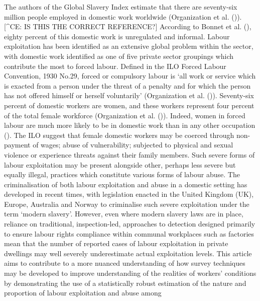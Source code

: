 \documentclass[
  12pt,
]{article}
\theoremstyle{plain}
\theoremstyle{definition}
\begin{document}
The authors of the Global Slavery Index estimate that there are
seventy-six million people employed in domestic work worldwide
(Organization et al.
()).{[}\^{}CE:
IS THIS THE CORRECT REFERENCE?{]} According to Bonnet et al.
(), eighty percent of this
domestic work is unregulated and informal. Labour exploitation has been
identified as an extensive global problem within the sector, with
domestic work identified as one of five private sector groupings which
contribute the most to forced labour. Defined in the ILO Forced Labour
Convention, 1930 No.29, forced or compulsory labour is `all work or
service which is exacted from a person under the threat of a penalty and
for which the person has not offered himself or herself voluntarily'
(Organization et al.
()).
Seventy-six percent of domestic workers are women, and these workers
represent four percent of the total female workforce (Organization et
al.
()).
Indeed, women in forced labour are much more likely to be in domestic
work than in any other occupation
(). The ILO suggest that female domestic workers may be
coerced through non-payment of wages; abuse of vulnerability; subjected
to physical and sexual violence or experience threats against their
family members. Such severe forms of labour exploitation may be present
alongside other, perhaps less severe but equally illegal, practices
which constitute various forms of labour abuse. The criminalisation of
both labour exploitation and abuse in a domestic setting has developed
in recent times, with legislation enacted in the United Kingdom (UK),
Europe, Australia and Norway to criminalise such severe exploitation
under the term `modern slavery'. However, even where modern slavery laws
are in place, reliance on traditional, inspection-led, approaches to
detection designed primarily to ensure labour rights compliance within
communal workplaces such as factories mean that the number of reported
cases of labour exploitation in private dwellings may well severely
underestimate actual exploitation levels. This article aims to
contribute to a more nuanced understanding of how survey techniques may
be developed to improve understanding of the realities of workers'
conditions by demonstrating the use of a statistically robust estimation
of the nature and proportion of labour exploitation and abuse among
\end{document}
